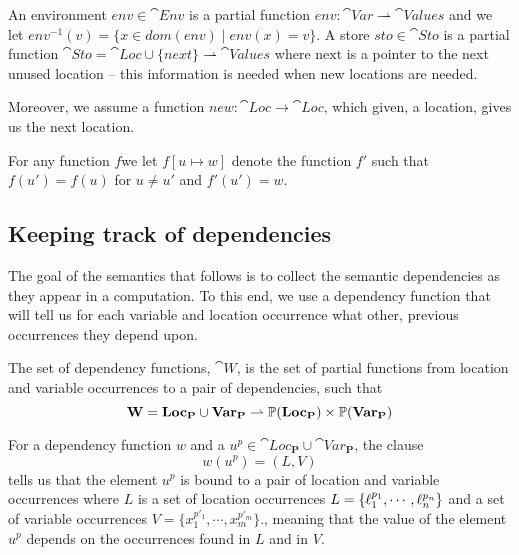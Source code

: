 \documentclass{llncs}
\newcommand{\nexte}{\ensuremath{\textrm{next}}\xspace}
\begin{document}
An environment $env \in \cat{Env} $ is a partial function $env:
\cat{Var}\rightharpoonup\cat{Values}$ and we let $env^{-1}(v)=\{x\in dom(env)\mid env(x)=v\}$.
%
A store $sto \in \cat{Sto}$ is a partial function
$\cat{Sto}=\cat{Loc}\cup\{next\}\rightharpoonup\cat{Values}$ where
$\nexte$ is a pointer to the next unused location -- this information
is needed when new locations are needed.

Moreover, we assume a function
$new:\cat{Loc}\rightarrow\cat{Loc}$, which given, a location, gives us
the next location.

For any function $f$we let $f[u
\mapsto w]$ denote the function $f'$ such that $f(u') = f(u)$ for $u
\neq u'$ and $f'(u') = w$.

\subsection{Keeping track of dependencies}\label{sec:DepFunc}

The goal of the semantics that follows is to collect the semantic
dependencies as they appear in a computation. To this end, we use a
dependency function that will tell us for each variable and location
occurrence what other, previous occurrences they depend upon.

\begin{definition}\label{def:DepFunc}
	The set of dependency functions, $\cat{W}$, is the set of
        partial functions from location and variable occurrences to a
        pair of dependencies, such that
\[
  \textbf{W}=\textbf{Loc}_{\mathbf{P}}\cup\textbf{Var}_{\mathbf{P}}\rightharpoonup\mathbb{P}(\textbf{Loc}_{\mathbf{P}})\times\mathbb{P}(\textbf{Var}_{\mathbf{P}}) \] 
\end{definition}
For a dependency function $w$ and a
$u^p\in\cat{Loc}_{\mathbf{P}}\cup\cat{Var}_{\mathbf{P}}$, the clause
%
\[ w (u^p)=(L,V) \]
%
tells us that the element $u^p$ is bound to a pair of location and
variable occurrences where $L$ is a set of location occurrences
$L=\{\ell_1^{p_1},\cdots,\ell_n^{p_n}\}$ and a set of variable
occurrences $V =\{x_1^{p'_1},\cdots,x_m^{p'_m}\}$., meaning that the
value of the element $u^p$ depends on the occurrences found in $L$ and
in $V$.
\end{document}
